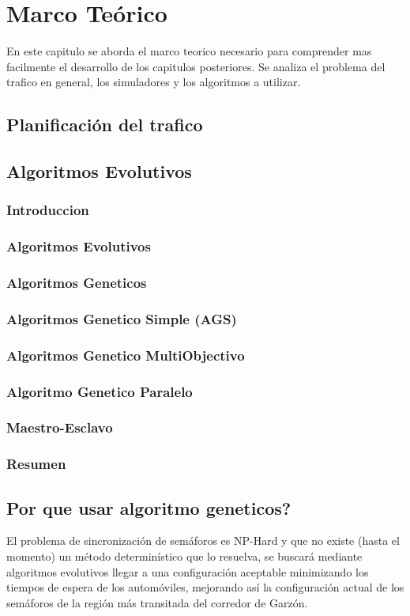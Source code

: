 \chapter{Marco Teórico}

 En este capitulo se aborda el marco teorico necesario para comprender mas facilmente el desarrollo de los capitulos posteriores. Se analiza el problema del trafico en general, los simuladores y los algoritmos a utilizar.

\section{Planificación del trafico}

\section{Algoritmos Evolutivos}
\subsection{Introduccion}
\subsection{Algoritmos Evolutivos}
\subsection{Algoritmos Geneticos}
\subsection{Algoritmos Genetico Simple (AGS)}
\subsection{Algoritmos Genetico MultiObjectivo}
\subsection{Algoritmo Genetico Paralelo}
\subsection{Maestro-Esclavo}
\subsection{Resumen}

\section{Por que usar algoritmo geneticos?}
El problema de sincronización de semáforos es NP-Hard y que
no existe (hasta el momento) un método determinístico que lo
resuelva, se buscará mediante algoritmos evolutivos llegar a
una configuración aceptable minimizando los tiempos de
espera de los automóviles, mejorando así la configuración
actual de los semáforos de la región más transitada del corredor
de Garzón.


